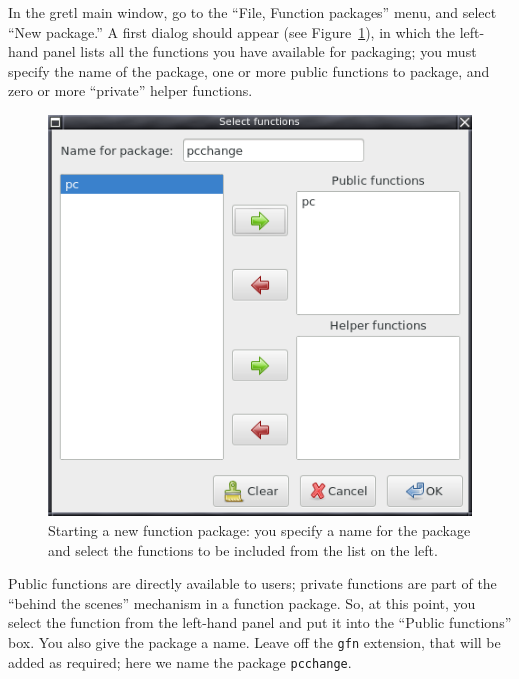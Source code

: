 \documentclass[oneside]{book}
\begin{document}
In the gretl main window, go to the ``File, Function packages'' menu,
and select ``New package.''  A first dialog should appear (see
Figure~\ref{fig:startpkg}), in which the left-hand panel lists all the
functions you have available for packaging; you must specify the name
of the package, one or more public functions to package, and zero or
more ``private'' helper functions.

\begin{figure}[htbp]
  \centering
  \includegraphics[scale=0.5]{figures/newpkg}
  \caption{Starting a new function package: you specify a name for the
    package and select the functions to be included from the list on
    the left.}
  \label{fig:startpkg}
\end{figure}

Public functions are directly available to users; private functions
are part of the ``behind the scenes'' mechanism in a function
package. So, at this point, you select the  function from the
left-hand panel and put it into the ``Public functions'' box. You also
give the package a name. Leave off the \texttt{gfn} extension, that
will be added as required; here we name the package \texttt{pcchange}.
\end{document}
